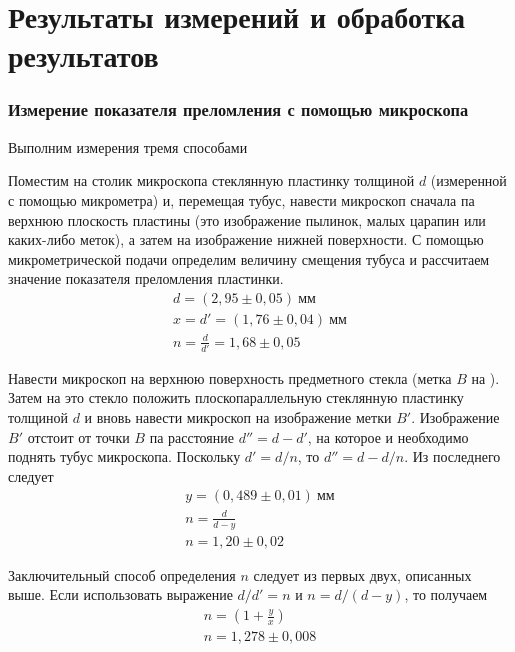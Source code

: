 \documentclass[a4paper, 12pt]{article}
\begin{document}
\section{Результаты измерений и обработка результатов}
\subsubsection*{Измерение показателя преломления с помощью микроскопа}
Выполним измерения тремя способами 

Поместим на столик микроскопа стеклянную пластинку толщиной $d$ 
(измеренной с помощью микрометра) и, перемещая тубус, навести
микроскоп сначала па верхнюю плоскость пластины (это изображение
пылинок, малых царапин или каких-либо меток), а затем на изображение
нижней поверхности. С помощью микрометрической подачи определим
величину смещения тубуса и рассчитаем значение показателя преломления
пластинки.
\begin{equation*}
    \begin{gathered}
        d = (2,95 \pm 0,05)\ \text{мм}\\
        x = d' = (1,76 \pm 0,04)\ \text{мм}\\
        n = \frac{d}{d'} = 1,68\pm 0,05
    \end{gathered}
\end{equation*}

Навести микроскоп на верхнюю поверхность предметного стекла
(метка $B$ на ). Затем на это стекло положить
плоскопараллельную стеклянную пластинку толщиной $d$ и вновь навести
микроскоп на изображение метки $B'$. Изображение $B'$ отстоит от
точки $B$ 
па расстояние $d'' = d-d'$, на которое и необходимо поднять тубус
микроскопа. Поскольку $d'=d/n$, то $d''=d-d/n$. Из последнего
следует
\begin{equation*}
    \begin{gathered}
        y = (0,489 \pm 0,01)\ \text{мм}\\
        n = \frac{d}{d-y}\\
        n = 1,20\pm 0,02
    \end{gathered}
\end{equation*}

Заключительный способ определения $n$ следует из первых двух,
описанных выше. Если использовать выражение $d/d' = n$ и $n =
d/(d-y)$, то получаем
\begin{equation*}
    \begin{gathered}
    n = \left(1+ \frac{y}{x} \right)\\
    n = 1,278 \pm 0,008
    \end{gathered}
\end{equation*}
\end{document}
